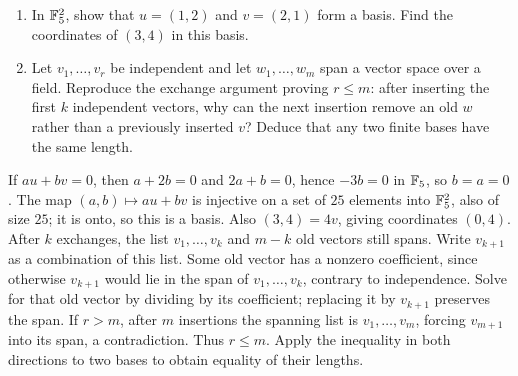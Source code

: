 \begin{enumerate}
\item In $\mathbb F_5^2$, show that $u=(1,2)$ and $v=(2,1)$ form a basis.
Find the coordinates of $(3,4)$ in this basis. 
\item Let $v_1,\ldots,v_r$ be independent and let $w_1,\ldots,w_m$
span a vector space over a field. Reproduce the exchange argument
proving $r\le m$: after inserting the first $k$ independent vectors,
why can the next insertion remove an old $w$ rather than a previously
inserted $v$? Deduce that any two finite bases have the same length.
\end{enumerate}
\begin{solution}
If $au+bv=0$, then $a+2b=0$ and $2a+b=0$, hence $-3b=0$ in $\mathbb F_5$,
so $b=a=0$. The map $(a,b)\mapsto au+bv$ is injective on a set of
$25$ elements into $\mathbb F_5^2$, also of size $25$; it is onto, so this is
a basis. Also $(3,4)=4v$, giving coordinates $(0,4)$.
After $k$ exchanges, the list $v_1,\ldots,v_k$ and $m-k$ old vectors
still spans. Write $v_{k+1}$ as a combination of this list. Some old
vector has a nonzero coefficient, since otherwise $v_{k+1}$ would lie
in the span of $v_1,\ldots,v_k$, contrary to independence. Solve for
that old vector by dividing by its coefficient; replacing it by
$v_{k+1}$ preserves the span. If $r>m$, after $m$ insertions the
spanning list is $v_1,\ldots,v_m$, forcing $v_{m+1}$ into its span,
a contradiction. Thus $r\le m$. Apply the inequality in both directions
to two bases to obtain equality of their lengths.
\end{solution}

